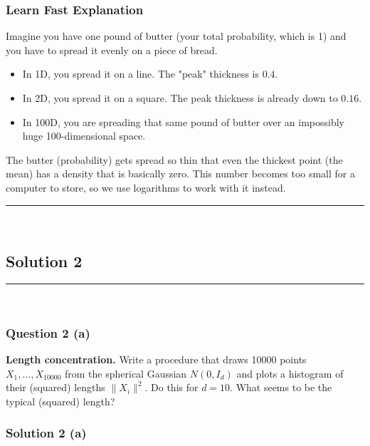\documentclass{article}
\begin{document}
\subsubsection*{Learn Fast Explanation}
Imagine you have one pound of butter (your total probability, which is 1) and you have to spread it evenly on a piece of bread.
\begin{itemize}
    \item In 1D, you spread it on a line. The "peak" thickness is $0.4$.
    \item In 2D, you spread it on a square. The peak thickness is already down to $0.16$.
    \item In 100D, you are spreading that same pound of butter over an impossibly huge 100-dimensional space.
\end{itemize}
The butter (probability) gets spread so thin that even the thickest point (the mean) has a density that is basically zero. This number becomes too small for a computer to store, so we use logarithms to work with it instead.

\noindent\rule{\textwidth}{0.4pt}\\

\newpage

\subsection*{Solution 2}
\noindent\rule{\textwidth}{0.4pt}\\
\subsubsection*{Question 2 (a)}
\begin{flushleft}
    \textbf{Length concentration.} Write a procedure that draws 10000 points $X_1, \ldots, X_{10000}$ from the spherical Gaussian $N(0, I_d)$ and plots a histogram of their (squared) lengths $\|X_i\|^2$. 
    Do this for $d=10$. What seems to be the typical (squared) length? 
\end{flushleft}

\subsubsection*{Solution 2 (a)}
\end{document}
